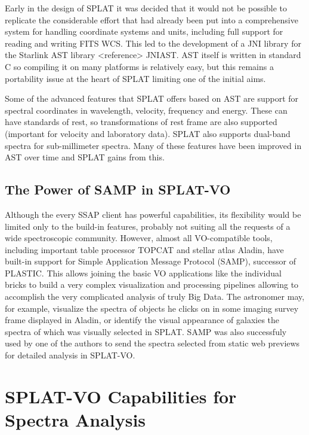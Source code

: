 \documentclass[final,authoryear,5p,times,twocolumn]{elsarticle}
\begin{document}
Early in the design of SPLAT it was decided that it would not be possible to
replicate the considerable effort that had already been put into a
comprehensive system for handling coordinate systems and units, including full
support for reading and writing FITS WCS. This led to the development of a JNI
library for the Starlink AST library <reference> JNIAST. AST itself is written
in standard C so compiling it on many platforms is relatively easy, but this
remains a portability issue at the heart of SPLAT limiting one of the initial
aims.

Some of the advanced features that SPLAT offers based on AST are support for
spectral coordinates in wavelength, velocity, frequency and energy. These can
have standards of rest, so transformations of rest frame are also supported
(important for velocity and laboratory data). SPLAT also supports dual-band
spectra for sub-millimeter spectra. Many of these features have been improved
in AST over time and SPLAT gains from this.


\subsection{The Power of SAMP in SPLAT-VO}

Although the every SSAP client has  powerful capabilities, its flexibility
would be limited only to the build-in features, probably not suiting all the
requests of a wide spectroscopic community. However, almost all VO-compatible
tools, including important table processor TOPCAT and stellar atlas Aladin,
have built-in support for Simple Application Message Protocol (SAMP), successor
of PLASTIC.  This allows joining the basic VO applications like the individual
bricks to build a very complex visualization and processing pipelines allowing
to accomplish the very complicated analysis of truly Big Data.  The astronomer
may, for example, visualize the spectra of objects he clicks on in some imaging
survey frame displayed in Aladin, or identify the visual appearance of galaxies
the spectra of which was visually selected in SPLAT.  SAMP was also successfuly
used by one of the authors to send the spectra selected from   static web
previews for detailed analysis in SPLAT-VO.


\section{SPLAT-VO Capabilities  for Spectra Analysis}
\end{document}

